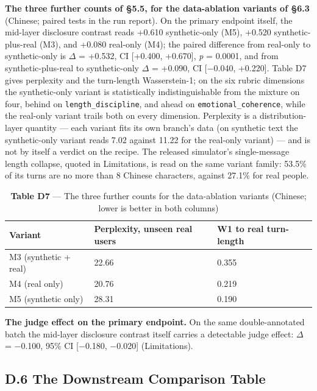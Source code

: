 \documentclass[letterpaper]{article}
\begin{document}
\textbf{The three further counts of \S{}5.5, for the data-ablation variants of \S{}6.3} (Chinese; paired tests in the run report). On the primary endpoint itself, the mid-layer disclosure contrast reads +0.610 synthetic-only (M5), +0.520 synthetic-plus-real (M3), and +0.080 real-only (M4); the paired difference from real-only to synthetic-only is $\Delta$ = +0.532, CI [+0.400, +0.670], \textit{p} = 0.0001, and from synthetic-plus-real to synthetic-only $\Delta$ = +0.090, CI [$-$0.040, +0.220]. Table D7 gives perplexity and the turn-length Wasserstein-1; on the six rubric dimensions the synthetic-only variant is statistically indistinguishable from the mixture on four, behind on \texttt{length\_discipline}, and ahead on \texttt{emotional\_coherence}, while the real-only variant trails both on every dimension. Perplexity is a distribution-layer quantity --- each variant fits its own branch's data (on synthetic text the synthetic-only variant reads 7.02 against 11.22 for the real-only variant) --- and is not by itself a verdict on the recipe. The released simulator's single-message length collapse, quoted in Limitations, is read on the same variant family: 53.5\% of its turns are no more than 8 Chinese characters, against 27.1\% for real people.


\begin{table}[t]
\centering\small
\setlength{\tabcolsep}{4pt}
\caption{\textbf{Table D7} --- The three further counts for the data-ablation variants (Chinese; lower is better in both columns)}
\begin{tabular}{@{}lll@{}}
\toprule
Variant & Perplexity, unseen real users & W1 to real turn-length \\
\midrule
M3 (synthetic + real) & 22.66 & 0.355 \\
M4 (real only) & 20.76 & 0.219 \\
M5 (synthetic only) & 28.31 & 0.190 \\
\bottomrule
\end{tabular}
\end{table}

\textbf{The judge effect on the primary endpoint.} On the same double-annotated batch the mid-layer disclosure contrast itself carries a detectable judge effect: $\Delta$ = $-$0.100, 95\% CI [$-$0.180, $-$0.020] (Limitations).


\subsection*{D.6 The Downstream Comparison Table}
\end{document}
